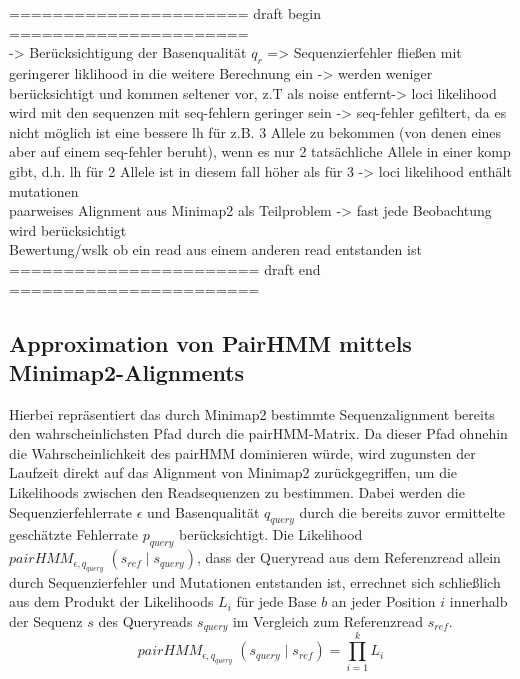 \noindent====================== draft begin ======================\\

-> Berücksichtigung der Basenqualität $q_{r}$ => Sequenzierfehler fließen mit geringerer liklihood in die weitere Berechnung ein -> werden weniger berücksichtigt und kommen seltener vor, z.T als noise entfernt-> loci likelihood wird mit den sequenzen mit seq-fehlern geringer sein -> seq-fehler gefiltert, da es nicht möglich ist eine  bessere lh für z.B. 3 Allele zu bekommen (von denen eines aber auf einem seq-fehler beruht), wenn es nur 2 tatsächliche Allele in einer komp gibt, d.h. lh für 2 Allele ist in diesem fall höher als für 3 -> loci likelihood enthält mutationen \\
paarweises Alignment aus Minimap2 als Teilproblem -> fast jede Beobachtung wird berücksichtigt\\
Bewertung/wslk ob ein read aus einem anderen read entstanden ist\\

\noindent======================= draft end =======================\\
\subsection{Approximation von PairHMM mittels Minimap2-Alignments} \label{phmm_minimap}

 Hierbei repräsentiert das durch Minimap2 bestimmte Sequenzalignment bereits den wahrscheinlichsten Pfad durch die pairHMM-Matrix. Da dieser Pfad ohnehin die Wahrscheinlichkeit des pairHMM dominieren würde, wird zugunsten der Laufzeit direkt auf das Alignment von Minimap2 zurückgegriffen, um die Likelihoods zwischen den Readsequenzen zu bestimmen. Dabei werden die Sequenzierfehlerrate $ \epsilon $ und Basenqualität $ q_{query} $ durch die bereits zuvor ermittelte geschätzte Fehlerrate $ p_{query} $ berücksichtigt. Die Likelihood $ pairHMM_{\epsilon, q_{query}} \;(s_{ref}\;|\; s_{query}) $, dass der Queryread aus dem Referenzread allein durch Sequenzierfehler und Mutationen entstanden ist, errechnet sich schließlich aus dem Produkt der Likelihoods $ L_{i} $ für jede Base $ b $ an jeder Position $ i $ innerhalb der Sequenz $ s $ des Queryreads $ s_{query} $ im Vergleich zum Referenzread $ s_{ref} $.
\begin{equation} \label{eqn:2-5}
\tag{2-5}
pairHMM_{\epsilon, q_{query}} \;(s_{query}\;|\; s_{ref}) = \prod_{i=1}^{k}L_{i}
\end{equation}

